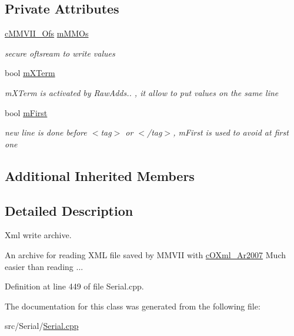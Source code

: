\subsection*{Private Attributes}
\begin{DoxyCompactItemize}
\item 
\hyperlink{classMMVII_1_1cMMVII__Ofs}{c\+M\+M\+V\+I\+I\+\_\+\+Ofs} \hyperlink{classMMVII_1_1cOXml__Ar2007_a4b20eacf0c662f84c87b573797eca556}{m\+M\+M\+Os}\hypertarget{classMMVII_1_1cOXml__Ar2007_a4b20eacf0c662f84c87b573797eca556}{}\label{classMMVII_1_1cOXml__Ar2007_a4b20eacf0c662f84c87b573797eca556}

\begin{DoxyCompactList}\small\item\em secure oftsream to write values \end{DoxyCompactList}\item 
bool \hyperlink{classMMVII_1_1cOXml__Ar2007_a5a474e250e836b4a176162170edfbc65}{m\+X\+Term}\hypertarget{classMMVII_1_1cOXml__Ar2007_a5a474e250e836b4a176162170edfbc65}{}\label{classMMVII_1_1cOXml__Ar2007_a5a474e250e836b4a176162170edfbc65}

\begin{DoxyCompactList}\small\item\em m\+X\+Term is activated by Raw\+Adds.. , it allow to put values on the same line \end{DoxyCompactList}\item 
bool \hyperlink{classMMVII_1_1cOXml__Ar2007_a920e56dbcb1e17207056483e8b1e8843}{m\+First}\hypertarget{classMMVII_1_1cOXml__Ar2007_a920e56dbcb1e17207056483e8b1e8843}{}\label{classMMVII_1_1cOXml__Ar2007_a920e56dbcb1e17207056483e8b1e8843}

\begin{DoxyCompactList}\small\item\em new line is done before $<$tag$>$ or $<$/tag$>$, m\+First is used to avoid at first one \end{DoxyCompactList}\end{DoxyCompactItemize}
\subsection*{Additional Inherited Members}


\subsection{Detailed Description}
Xml write archive. 

An archive for reading X\+ML file saved by M\+M\+V\+II with \hyperlink{classMMVII_1_1cOXml__Ar2007}{c\+O\+Xml\+\_\+\+Ar2007} Much easier than reading ... 

Definition at line 449 of file Serial.\+cpp.



The documentation for this class was generated from the following file\+:\begin{DoxyCompactItemize}
\item 
src/\+Serial/\hyperlink{Serial_8cpp}{Serial.\+cpp}\end{DoxyCompactItemize}
